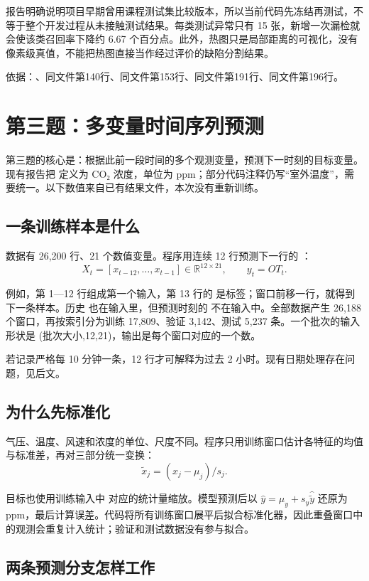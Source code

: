 \documentclass[UTF8,fontset=windows,11pt,a4paper]{ctexart}
\begin{document}
报告明确说明项目早期曾用课程测试集比较版本，所以当前代码先冻结再测试，不等于整个开发过程从未接触测试结果。每类测试异常只有 15 张，新增一次漏检就会使该类召回率下降约 6.67 个百分点。此外，热图只是局部距离的可视化，没有像素级真值，不能把热图直接当作经过评价的缺陷分割结果。

依据：、同文件第140行、同文件第153行、同文件第191行、同文件第196行。\section{第三题：多变量时间序列预测}

第三题的核心是：根据此前一段时间的多个观测变量，预测下一时刻的目标变量。现有报告把  定义为 CO₂ 浓度，单位为 ppm；部分代码注释仍写“室外温度”，需要统一。以下数值来自已有结果文件，本次没有重新训练。

\subsection{一条训练样本是什么}

数据有 26,200 行、21 个数值变量。程序用连续 12 行预测下一行的 ：
\[
X_t=[x_{t-12},\ldots,x_{t-1}]\in\mathbb R^{12\times21},\qquad y_t=OT_t.
\]

例如，第 1—12 行组成第一个输入，第 13 行的  是标签；窗口前移一行，就得到下一条样本。历史  也在输入里，但预测时刻的  不在输入中。全部数据产生 26,188 个窗口，再按索引分为训练 17,809、验证 3,142、测试 5,237 条。一个批次的输入形状是 \textnormal{(批次大小,12,21)}，输出是每个窗口对应的一个数。

若记录严格每 10 分钟一条，12 行才可解释为过去 2 小时。现有日期处理存在问题，见后文。

\subsection{为什么先标准化}

气压、温度、风速和浓度的单位、尺度不同。程序只用训练窗口估计各特征的均值与标准差，再对三部分统一变换：
\[
\widetilde x_j=(x_j-\mu_j)/s_j.
\]

目标也使用训练输入中  对应的统计量缩放。模型预测后以 \(\widehat y=\mu_y+s_y\widehat{\widetilde y}\) 还原为 ppm，最后计算误差。代码将所有训练窗口展平后拟合标准化器，因此重叠窗口中的观测会重复计入统计；验证和测试数据没有参与拟合。

\subsection{两条预测分支怎样工作}
\end{document}
